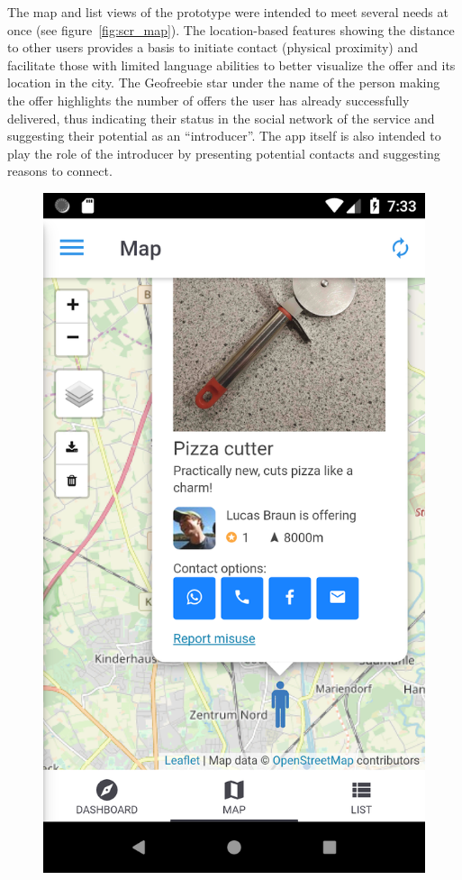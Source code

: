The map and list views of the prototype were intended to meet several needs at once (see figure~\ref{fig:scr_map}). The location-based features showing the distance to other users provides a basis to initiate contact (physical proximity) and facilitate those with limited language abilities to better visualize the offer and its location in the city. The Geofreebie star under the name of the person making the offer highlights the number of offers the user has already successfully delivered, thus indicating their status in the social network of the service and suggesting their potential as an ``introducer''. The app itself is also intended to play the role of the introducer by presenting potential contacts and suggesting reasons to connect.

\begin{figure}[ht]
  \centering
  \includegraphics[scale=0.25]{images/screenshots/screenshot_map.png}

\end{figure}
